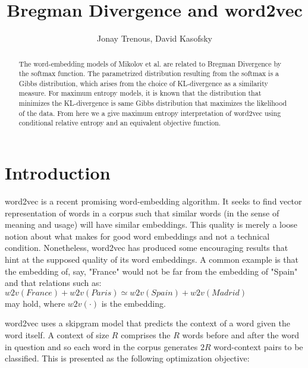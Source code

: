 \documentclass[]{article}
\title{Bregman Divergence and word2vec}
\author{Jonay Trenous, David Kasofsky}
\begin{document}
\maketitle

\begin{abstract}

\noindent The word-embedding models of Mikolov et al.\cite{word2vec1}\cite{word2vec2} are related to Bregman Divergence by the softmax function. The parametrized distribution resulting from the softmax is a Gibbs distribution, which arises from the choice of KL-divergence as a similarity measure. For maximum entropy models, it is known that the distribution that minimizes the KL-divergence is same Gibbs distribution that maximizes the likelihood of the data. From here we a give maximum entropy interpretation of word2vec using conditional relative entropy and an equivalent objective function.

\end{abstract}

\section{Introduction}

word2vec\cite{word2vec1}\cite{word2vec2} is a recent promising word-embedding algorithm. It seeks to find vector representation of words in a corpus such that similar words (in the sense of meaning and usage) will have similar embeddings. This quality is merely a loose notion about what makes for good word embeddings and not a technical condition. Nonetheless, word2vec has produced some encouraging results\cite{dummy} that hint at the supposed quality of its word embeddings. A common example is that the embedding of, say, "France" would not be far from the embedding of "Spain"\cite{dummy} and that relations such as:\\

$w2v(France) + w2v(Paris) \simeq w2v(Spain) + w2v(Madrid)$\\

\noindent may hold, where $w2v(\cdot)$ is the embedding.

word2vec uses a skipgram model that predicts the context of a word given the word itself. A context of size $R$ comprises the $R$ words before and after the word in question and so each word in the corpus generates $2R$ word-context pairs to be classified. This is presented as the following optimization objective:\\
\end{document}
